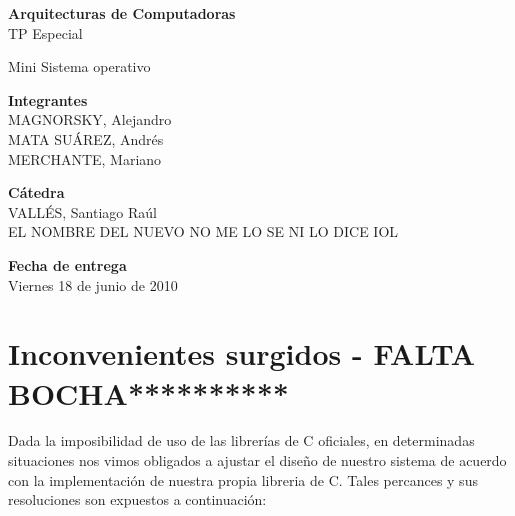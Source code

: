 \documentclass[12pt, a4paper, spanish]{report}
\begin{document}
\begin{center}
\textbf{\LARGE{Arquitecturas de Computadoras}}\\
\large{TP Especial}\par \noindent \newline \newline
\large{Mini Sistema operativo}
\end{center}
\par \noindent \newline \newline \newline \newline \newline \newline \newline \newline \newline \newline \newline
\newline \newline \newline \newline \newline
\large{\textbf{Integrantes}}\\
\indent \small{MAGNORSKY, Alejandro}\\
\indent \small{MATA SU\'AREZ, Andr\'es}\\
\indent \small{MERCHANTE, Mariano}\newline
\par \noindent
\large{\textbf{C\'atedra}}\\
\indent \small{VALL\'ES, Santiago Ra\'ul}\\
\indent \small{EL NOMBRE DEL NUEVO NO ME LO SE NI LO DICE IOL}\newline
\par \noindent
\large{\textbf{Fecha de entrega}}\\
\indent \small{Viernes 18 de junio de 2010}

\tableofcontents

\chapter*{Inconvenientes surgidos - FALTA BOCHA**********}
\indent Dada la imposibilidad de uso de las librer\'ias de C oficiales, en determinadas situaciones nos vimos obligados a
ajustar el dise\~no de nuestro sistema de acuerdo con la implementaci\'on de nuestra propia libreria de C. Tales percances
y sus resoluciones son expuestos a continuaci\'on:\\
\end{document}
